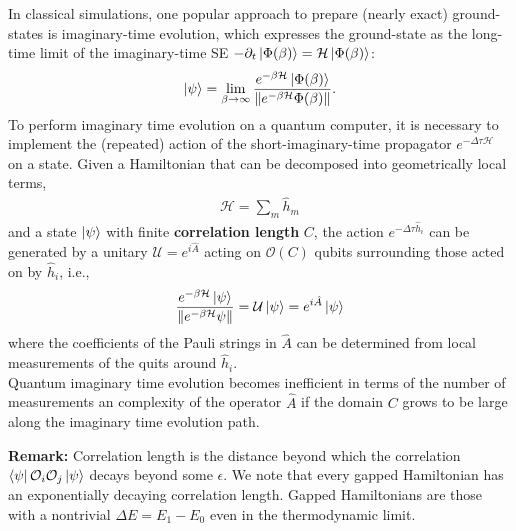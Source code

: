 \documentclass{book}
\theoremstyle{definition}
\newcommand{\p}{\partial}
\newcommand{\had}{\mathcal{H}}
\newcommand{\f}[2]{\frac{#1}{#2}}
\newcommand{\U}{\mathcal{U}}
\begin{document}
\begin{enumerate}
	In classical simulations, one popular approach to prepare (nearly exact) ground-states is imaginary-time evolution,
	which expresses the ground-state as the long-time limit of the
	imaginary-time SE $-\p_t \ket{\Phi(\beta)} = \had \ket{\Phi(\beta)}$:
	\begin{align}
	\ket{\psi} = \lim_{\beta \to \infty} \f{e^{-\beta \had} \ket{\Phi(\beta)}}{\norm{e^{-\beta \had} \Phi(\beta)}}.
	\end{align} 
	To perform imaginary time evolution on a quantum computer, it is necessary to implement the (repeated) action of the
	short-imaginary-time propagator $e^{-\Delta \tau \had}$
	on a state. Given a Hamiltonian that can be decomposed into geometrically local terms,
	\begin{align}
	\had = \sum _m \hat{h}_m
	\end{align}
	and a state $\ket{\psi}$ with finite \textbf{correlation length} $C$, the action $e^{-\Delta \tau \hat{h}_i}$ can be generated by a unitary $\U = e^{i\hat{A}}$ acting on $\mathcal{O}(C)$ qubits surrounding those acted on by $\hat{h}_i$, i.e.,
	\begin{align}
	\f{e^{-\beta \had} \ket{\psi}}{\norm{e^{-\beta \had} \psi}} = \U \ket{\psi}= e^{i\hat{A}}\ket{\psi}
	\end{align}	
	where the coefficients of the Pauli strings in $\hat{A}$ can be determined from local measurements of the quits around $\hat{h}_i$.\\
	
	
	Quantum imaginary time evolution becomes inefficient in terms of the number of measurements an complexity of the operator $\hat{A}$ if the domain $C$ grows to be large along the imaginary time evolution path. 
	
	
	\textbf{Remark:} Correlation length is the distance beyond which the correlation $\bra{\psi}\mathcal{O}_i \mathcal{O}_j\ket{\psi}$ decays beyond some $\epsilon$. We note that every gapped Hamiltonian has an exponentially decaying correlation length. Gapped Hamiltonians are those with a nontrivial $\Delta E = E_1 - E_0$ even in the thermodynamic limit. \\
	
	
	

	
	
	
	
	
	
	
	
	
	
	
\end{enumerate}
\end{document}
